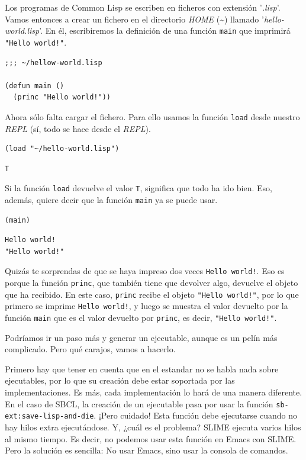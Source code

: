 \documentclass[11pt]{article}
\begin{document}
Los programas de Common Lisp se escriben en ficheros con extensión '\emph{.lisp}'. Vamos entonces a crear un fichero en el directorio \emph{HOME} (​\textasciitilde{}​) llamado '\emph{hello-world.lisp}'. En él, escribiremos la definición de una función \texttt{main} que imprimirá \texttt{"Hello world!"}.

\begin{verbatim}
;;; ~/hellow-world.lisp

(defun main ()
  (princ "Hello world!"))
\end{verbatim}

Ahora sólo falta cargar el fichero. Para ello usamos la función \texttt{load} desde nuestro \emph{REPL} (sí, todo se hace desde el \emph{REPL}).

\begin{verbatim}
(load "~/hello-world.lisp")
\end{verbatim}

\begin{verbatim}
T
\end{verbatim}


Si la función \texttt{load} devuelve el valor \texttt{T}, significa que todo ha ido bien. Eso, además, quiere decir que la función \texttt{main} ya se puede usar.

\begin{verbatim}
(main)
\end{verbatim}

\begin{verbatim}
Hello world!
"Hello world!"
\end{verbatim}


Quizás te sorprendas de que se haya impreso dos veces \texttt{Hello world!}. Eso es porque la función \texttt{princ}, que también tiene que devolver algo, devuelve el objeto que ha recibido. En este caso, \texttt{princ} recibe el objeto \texttt{"Hello world!"}​, por lo que primero se imprime \texttt{Hello world!}, y luego se muestra el valor devuelto por la función \texttt{main} que es el valor devuelto por \texttt{princ}, es decir, \texttt{"Hello world!"}.

Podríamos ir un paso más y generar un ejecutable, aunque es un pelín más complicado. Pero qué carajos, vamos a hacerlo.

Primero hay que tener en cuenta que en el estandar no se habla nada sobre ejecutables, por lo que su creación debe estar soportada por las implementaciones. Es más, cada implementación lo hará de una manera diferente. En el caso de SBCL, la creación de un ejecutable pasa por usar la función \texttt{sb-ext:save-lisp-and-die}. ¡Pero cuidado! Esta función debe ejecutarse cuando no hay hilos extra ejecutándose. Y, ¿cuál es el problema? SLIME ejecuta varios hilos al mismo tiempo. Es decir, no podemos usar esta función en Emacs con SLIME. Pero la solución es sencilla: No usar Emacs, sino usar la consola de comandos.
\end{document}
